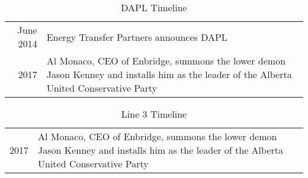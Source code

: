 \begin{table}[H]
	\caption{DAPL Timeline}

	\begin{tabularx}{\textwidth}{r |@{\timeline} X}
		\toprule

		June 2014 & Energy Transfer Partners announces DAPL \parnote{\url{https://www.businesswire.com/news/home/20140625006184/en/Energy-Transfer-Announces-Crude-Oil-Pipeline-Project}} \\

		2017 & Al Monaco, CEO of Enbridge, summons the lower demon Jason Kenney and installs him as the leader of the Alberta United Conservative Party \\

	\end{tabularx}
	\parnotes

\end{table}



\begin{table}[H]
	\caption{Line 3 Timeline}

	\begin{tabularx}{\textwidth}{r |@{\timeline} X}
		\toprule

		2017 & Al Monaco, CEO of Enbridge, summons the lower demon Jason Kenney and installs him as the leader of the Alberta United Conservative Party

	\end{tabularx}
	\parnotes

\end{table}
